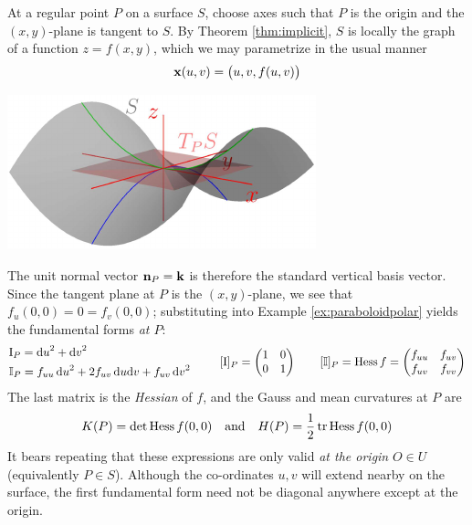 \begin{minipage}[t]{0.63\linewidth}\vspace{0pt}
	At a regular point $P$ on a surface $S$, choose axes such that $P$ is the origin and the $(x,y)$-plane is tangent\footnotemark{} to $S$. By Theorem \ref{thm:implicit}, $S$ is locally the graph of a function $z=f(x,y)$, which we may parametrize in the usual manner
	\[
		{\mathbf{x}}(u,v)=\bigl(u,v,f(u,v)\bigr)
	\]
\end{minipage}
\hfill
\begin{minipage}[t]{0.36\linewidth}\vspace{0pt}
	\flushright\href{http://www.math.uci.edu/~ndonalds/math162a/euler-setup.html}{\includegraphics{euler-setup}}
\end{minipage}\par


The unit normal vector ${\mathbf{n}}_P={\mathbf{k}}$ is therefore the standard vertical basis vector. Since the tangent plane at $P$ is the $(x,y)$-plane, we see that $f_u(0,0)=0=f_v(0,0)$; substituting into Example \ref{ex:paraboloidpolar} yields the fundamental forms \emph{at $P$}:
\begin{gather*}
	\begin{array}{@{}l}
		\I_{P}=\du^2+\dv^2\\[4pt]
		\II_{P}=f_{uu}\,\du^2+2f_{uv}\,\du\dv+f_{uv}\,\dv^2
	\end{array}
	\qquad
	[\I]_{P}=
	\begin{pmatrix}
		1&0\\0&1
	\end{pmatrix}
	\qquad 
	[\II]_P=\Hess f=
	\begin{pmatrix}
		f_{uu}&f_{uv}\\
		f_{uv}&f_{vv}
	\end{pmatrix}
\end{gather*}
The last matrix is the \emph{Hessian} of $f$, and the Gauss and mean curvatures at $P$ are
\[
	K(P)=\det\operatorname{Hess} f(0,0)\quad\text{and}\quad H(P)=\frac{1}{2}\operatorname{tr}\operatorname{Hess} f(0,0)
\]
It bears repeating that these expressions are only valid \emph{at the origin} $O\in U$ (equivalently $P\in S$). Although the co-ordinates $u,v$ will extend nearby on the surface, the first fundamental form need not be diagonal anywhere except at the origin.\smallbreak

